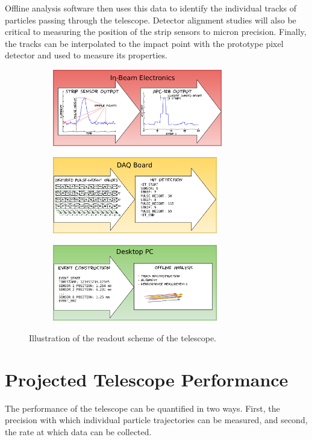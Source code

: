 \documentclass{PoS}
\begin{document}
Offline analysis software then uses this data to identify the individual tracks
of particles passing through the telescope. Detector alignment studies will
also be critical to measuring the position of the strip sensors to micron
precision. Finally, the tracks can be interpolated to the impact point with the
prototype pixel detector and used to measure its properties.
\begin{figure}[h]
  \centering
  \begin{subfigure}[b]{0.49\textwidth}
    \includegraphics[height=1.32in]{../figures/Telescope_Data_Flow_Stage_I.pdf}
  \end{subfigure}
  \begin{subfigure}[b]{0.49\textwidth}
    \includegraphics[height=1.32in]{../figures/Telescope_Data_Flow_Stage_II.pdf}
  \end{subfigure}
  \begin{subfigure}[b]{0.49\textwidth}
    \includegraphics[height=1.32in]{../figures/Telescope_Data_Flow_Stage_III.pdf}
  \end{subfigure}
  \caption{Illustration of the readout scheme of the telescope.}
\label{fig:readout}
\end{figure}


\section{Projected Telescope Performance}
The performance of the telescope can be quantified in two ways. First, the
precision with which individual particle trajectories can be measured, and
second, the rate at which data can be collected. 
\end{document}
